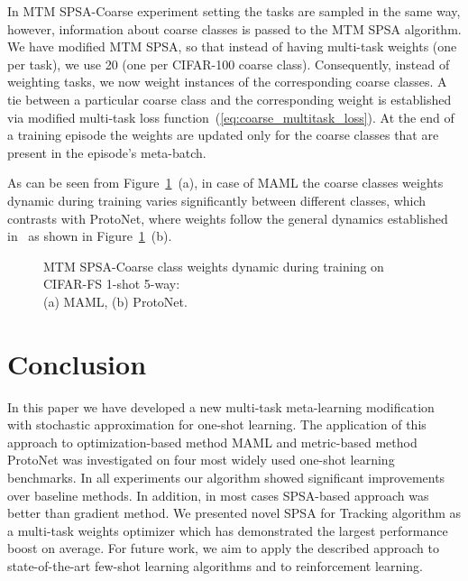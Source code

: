 \documentclass{article}
\begin{document}
In MTM SPSA-Coarse experiment setting the tasks are sampled in the same way, however, information about coarse classes is passed to the MTM SPSA algorithm. We have modified MTM SPSA, so that instead of having  multi-task weights (one per task), we use 20 (one per CIFAR-100 coarse class). Consequently, instead of weighting tasks, we now weight instances of the corresponding coarse classes. A tie between a particular coarse class and the corresponding weight is established via modified multi-task loss function~(\ref{eq:coarse_multitask_loss}). At the end of a training episode the weights are updated only for the coarse classes that are present in the episode's meta-batch.

As can be seen from Figure~\ref{fig:coarse-classes-cifarfs-5way-5shot}~(a), in case of MAML the coarse classes weights  dynamic during training varies significantly between different classes, which contrasts with ProtoNet, where weights follow the general dynamics established in~\cite{boiarov2020simultaneous} as shown in Figure~\ref{fig:coarse-classes-cifarfs-5way-5shot}~(b). 


\begin{figure}[ht]
    \centering
    \caption{MTM SPSA-Coarse class weights dynamic during training on CIFAR-FS 1-shot 5-way:\\ (a) MAML, (b) ProtoNet.}
    \label{fig:coarse-classes-cifarfs-5way-5shot}
\end{figure}













\section{Conclusion}

In this paper we have developed a new multi-task meta-learning modification with stochastic approximation for one-shot learning. The application of this approach to optimization-based method MAML and metric-based method ProtoNet was investigated on four most widely used one-shot learning benchmarks. In all experiments our algorithm showed significant improvements over baseline methods. In addition, in most cases SPSA-based approach was better than gradient method. We presented novel SPSA for Tracking algorithm as a multi-task weights optimizer which has demonstrated the largest performance boost on average. For future work, we aim to apply the described approach to state-of-the-art few-shot learning algorithms and to reinforcement learning.




  
\end{document}
